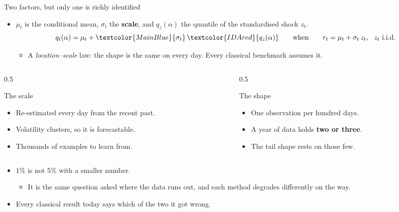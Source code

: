\documentclass[9pt, aspectratio=169, t]{beamer}
\newcommand{\scale}[1]{\textcolor{MainBlue}{#1}}
\newcommand{\shape}[1]{\textcolor{IDAred}{#1}}
\begin{document}
\begin{frame}{Two factors, but only one is richly identified}
  \begin{itemize}
    \item $\mu_{t}$ is the conditional mean, $\sigma_{t}$ the \textbf{scale}, and
          $q_{z}(\alpha)$ the quantile of the standardised shock $z_{t}$.
      \[ q_{t}(\alpha) = \mu_{t} + \scale{\sigma_{t}}\,\shape{q_{z}(\alpha)}
         \qquad\text{when}\qquad
         r_{t} = \mu_{t} + \sigma_{t}\,z_{t},\ \ z_{t}\ \text{i.i.d.} \]
      \vspace{-1.1em}
      \begin{itemize}
        \item A \emph{location--scale} law: the shape is the same on every day. Every
              classical benchmark assumes it.
      \end{itemize}
  \end{itemize}
  \begin{columns}[T]
    \begin{column}{0.5\textwidth}
      \begin{block}{The scale}
        \begin{itemize}
          \item Re-estimated every day from the recent past.
          \item Volatility clusters, so it is forecastable.
          \item Thousands of examples to learn from.
        \end{itemize}
      \end{block}
    \end{column}
    \begin{column}{0.5\textwidth}
      \begin{alertblock}{The shape}
        \begin{itemize}
          \item One observation per hundred days.
          \item A year of data holds \textbf{two or three}.
          \item The tail shape rests on those few.
        \end{itemize}
      \end{alertblock}
    \end{column}
  \end{columns}
  \vspace{0.5em}
  \begin{itemize}
    \item $1\%$ is not $5\%$ with a smaller number.
      \begin{itemize}
        \item It is the same question asked where the data runs out, and each method
              degrades differently on the way.
      \end{itemize}
    \item[\textcolor{IDAred}{$\boxdot$}] \textcolor{IDAred}{Every classical result
          today says which of the two it got wrong.}
  \end{itemize}
\end{frame}
\end{document}
